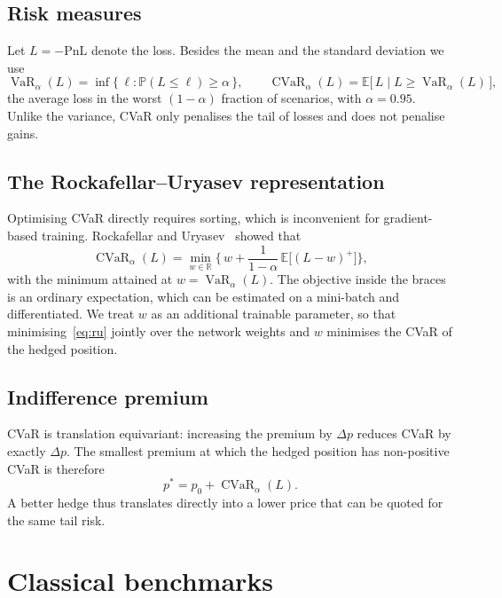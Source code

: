 \documentclass[11pt,a4paper]{article}
\newcommand{\E}{\mathbb{E}}
\newcommand{\CVaR}{\operatorname{CVaR}}
\newcommand{\VaR}{\operatorname{VaR}}
\newcommand{\PnL}{\mathrm{PnL}}
\begin{document}
\subsection{Risk measures}

Let $L = -\PnL$ denote the loss. Besides the mean and the standard deviation we use
\begin{equation}
  \VaR_\alpha(L) = \inf\{\, \ell : \mathbb{P}(L \le \ell) \ge \alpha \,\}, \qquad
  \CVaR_\alpha(L) = \E\big[\,L \mid L \ge \VaR_\alpha(L)\,\big],
\end{equation}
the average loss in the worst $(1-\alpha)$ fraction of scenarios, with $\alpha = 0.95$.
Unlike the variance, CVaR only penalises the tail of losses and does not penalise gains.

\subsection{The Rockafellar--Uryasev representation}

Optimising CVaR directly requires sorting, which is inconvenient for gradient-based training.
Rockafellar and Uryasev~\cite{rockafellar2000} showed that
\begin{equation}\label{eq:ru}
  \CVaR_\alpha(L) = \min_{w \in \mathbb{R}} \Big\{\, w + \frac{1}{1-\alpha}\, \E\big[(L - w)^+\big] \Big\},
\end{equation}
with the minimum attained at $w = \VaR_\alpha(L)$. The objective inside the braces is an ordinary
expectation, which can be estimated on a mini-batch and differentiated. We treat $w$ as an
additional trainable parameter, so that minimising~\eqref{eq:ru} jointly over the network weights
and $w$ minimises the CVaR of the hedged position.

\subsection{Indifference premium}

CVaR is translation equivariant: increasing the premium by $\Delta p$ reduces CVaR by exactly
$\Delta p$. The smallest premium at which the hedged position has non-positive CVaR is therefore
\begin{equation}
  p^\ast = p_0 + \CVaR_\alpha(L).
\end{equation}
A better hedge thus translates directly into a lower price that can be quoted for the same tail risk.

\section{Classical benchmarks}
\end{document}
